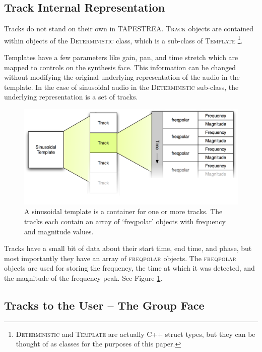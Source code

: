\documentclass{article}
\newcommand{\noun}[1]{\textsc{#1}}
\begin{document}
\subsection{Track Internal Representation}

Tracks do not stand on their own in TAPESTREA. \noun{Track} objects are
contained within objects of the \noun{Deterministic} class, which is a
sub-class of \noun{Template} \footnote{\noun{Deterministic} and \noun{Template}
are actually C++ struct types, but they can be thought of as classes for the
purposes of this paper.}.

Templates have a few parameters like gain, pan, and time stretch which are
mapped to controls on the synthesis face. This information can be changed
without modifying the original underlying representation of the audio in the
template. In the case of sinusoidal audio in the \noun{Deterministic}
sub-class, the underlying representation is a set of tracks.

\begin{figure}
\includegraphics[scale=0.4]{images/deterministic}

\caption{\label{fig:sinusoidal}A sinusoidal template is a container for one or
more tracks. The tracks each contain an array of `freqpolar' objects with
frequency and magnitude values.}
\end{figure}

Tracks have a small bit of data about their start time, end time, and phase,
but most importantly they have an array of \noun{freqpolar} objects. The
\noun{freqpolar} objects are used for storing the frequency, the time at which
it was detected, and the magnitude of the frequency peak. See Figure
\ref{fig:sinusoidal}.

\subsection{Tracks to the User -- The Group Face}
\end{document}
